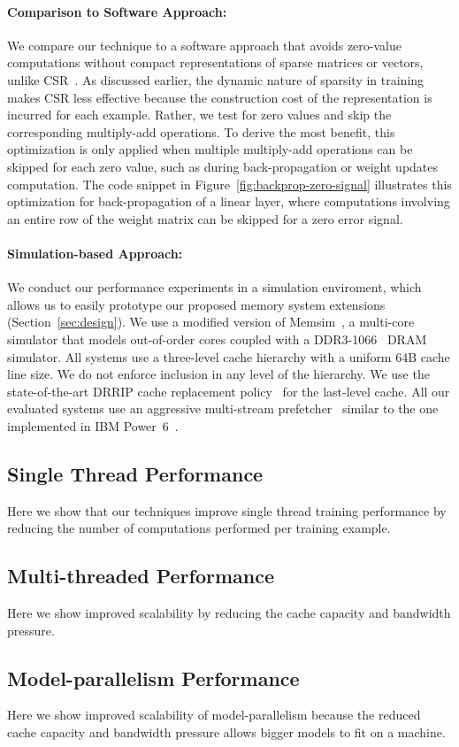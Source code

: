  \paragraph{Comparison to Software Approach:}
 We compare our technique to a software approach that avoids zero-value computations without compact representations of sparse matrices or vectors,  unlike CSR~\cite{IntelSparseMatrix}. As discussed earlier, the dynamic nature of sparsity in training makes CSR less effective because the construction cost of the representation is incurred for each example.  Rather, we test for zero values and skip the corresponding multiply-add operations. To derive the most benefit, this optimization is only applied when multiple multiply-add operations can be skipped for each zero value, such as during back-propagation or weight updates computation.  The code snippet in Figure~\ref{fig:backprop-zero-signal} illustrates this optimization for back-propagation of a linear layer, where computations involving an entire row of the weight matrix can be skipped for a zero error signal. 

\paragraph{Simulation-based Approach:} 
We conduct our performance experiments in a simulation enviroment, which allows us to easily prototype our proposed memory system extensions (Section~\ref{sec:design}).  We use a modified version of Memsim~\cite{memsim,eaf}, a multi-core simulator that models out-of-order cores coupled with a DDR3-1066~\cite{ddr3} DRAM  simulator. All systems use a three-level cache hierarchy with a  uniform 64B cache line size. We do not enforce inclusion in any level of the hierarchy. We use the state-of-the-art DRRIP cache replacement policy~\cite{rrip} for the last-level cache. All our evaluated systems use an aggressive multi-stream  prefetcher~\cite{fdp} similar to the one implemented in IBM Power~6~\cite{power6-prefetcher}.
 
\subsection{Single Thread Performance}
\label{subsec:perf_single_thread}

Here we show that our techniques improve single thread training performance by reducing the number of computations performed per training example.

\subsection{Multi-threaded Performance}
\label{subsec:perf_multi_thread}

Here we show improved scalability by reducing the cache capacity and bandwidth pressure. 


\subsection{Model-parallelism Performance}
\label{subsec:perf_model_parallel}

Here we show improved scalability of model-parallelism because the reduced cache capacity and bandwidth pressure allows bigger models to fit on a machine. 
